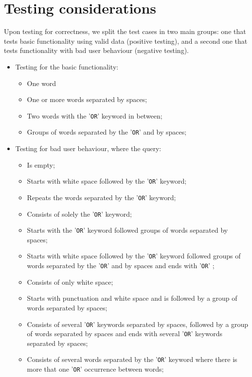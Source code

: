 \section{Testing considerations} %
Upon testing for correctness, we split the test cases in two main groups: one that tests basic functionality using valid data (positive testing), and a second one that tests functionality with bad user behaviour (negative testing).
\begin{itemize}
    \item Testing for the basic functionality:
        \begin{itemize}
            \item One word
            \item One or more words separated by spaces;
            \item Two words with the '{\tt OR}' keyword in between;
            \item Groups of words separated by the '{\tt OR}' and by spaces;
        \end{itemize}
    \item Testing for bad user behaviour, where the query:
    \begin{itemize}
        \item Is empty;
        \item Starts with white space followed by the '{\tt OR}' keyword;
        \item Repeats the words separated by the '{\tt OR}' keyword;
        \item Consists of solely the '{\tt OR}' keyword;
        \item Starts with the '{\tt OR}' keyword followed groups of words separated by spaces;
        \item Starts with white space followed by the '{\tt OR}' keyword followed groups of words separated by the '{\tt OR}' and by spaces and ends with '{\tt OR}' ;
        \item Consists of only white space;
        \item Starts with punctuation and white space and is followed by a group of words separated by spaces;
        \item Consists of several '{\tt OR}' keywords separated by spaces, followed by a group of words separated by spaces and ends with several '{\tt OR}' keywords separated by spaces;
        \item Consists of several words separated by the '{\tt OR}' keyword where there is more that one '{\tt OR}' occurrence between words;

\end{itemize}
\end{itemize}
